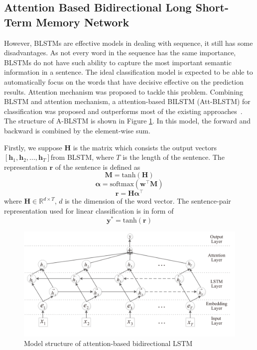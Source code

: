\subsection{Attention Based Bidirectional Long Short-Term Memory Network}
However, BLSTMs are effective models in dealing with sequence, it still has some disadvantages. As not every word in the sequence has the same importance, BLSTMs do not have such ability to capture the most important semantic information in a sentence. The ideal classification model is expected to be able to automatically focus on the words that have decisive effective on the prediction results. Attention mechanism was proposed to tackle this problem. Combining BLSTM and attention mechanism, a attention-based BILSTM (Att-BLSTM) for classification was proposed and outperforms most of the existing approaches~\cite{zhou2016attention}. The structure of A-BLSTM is shown in Figure \ref{attention_blstm}. In this model, the forward and backward is combined by the element-wise sum. 

Firstly, we suppose $\mathbf{H}$ is the matrix which consists the output vectors $[\mathbf{h}_1, \mathbf{h}_2,...,\mathbf{h}_T]$from BLSTM, where $T$ is the length of the sentence. The representation $\mathbf{r}$ of the sentence is defined as 
\begin{equation}
\mathbf{M} = \mbox{tanh}(\mathbf{H})
\end{equation}
\begin{equation}
\mathbf{\alpha} = \mbox{softmax}(\mathbf{w}^{\intercal}\mathbf{M})
\end{equation}
\begin{equation}
\mathbf{r} = \mathbf{H} \mathbf{\alpha} ^\intercal
\end{equation}
where $\mathbf{H} \in \mathbb{R}^{d\times T}$, $d$ is the dimension of the word vector. The sentence-pair representation used for linear classification is in form of
\begin{equation}
\mathbf{y}^* = \mbox{tanh}(\mathbf{r})
\end{equation}

\begin{figure}
\caption{Model structure of attention-based bidirectional LSTM}
\label{attention_blstm}
\centering
\includegraphics{attention_blstm.png}
\end{figure}

